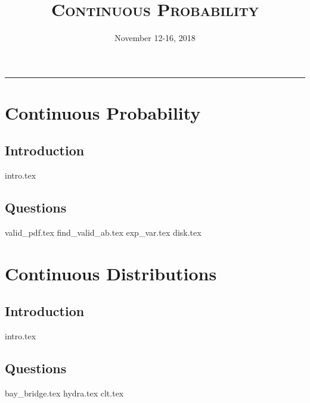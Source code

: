 \documentclass{exam}
\title{\textsc{Continuous Probability}}
\date{November 12-16, 2018}
\begin{document}
\maketitle
\rule{\textwidth}{0.15em}
\fontsize{12}{15}\selectfont
\thispagestyle{empty}


\section{Continuous Probability}
\subsection{Introduction}
{intro.tex}
\subsection{Questions}
\begin{questions}
    {valid_pdf.tex}
    {find_valid_ab.tex}
    {exp_var.tex} %
    {disk.tex}
\end{questions}

\section{Continuous Distributions}
\subsection{Introduction}
{intro.tex}
\subsection{Questions}
\begin{questions}
    {bay_bridge.tex} 
    {hydra.tex}  
    {clt.tex}
\end{questions} 
\end{document}
